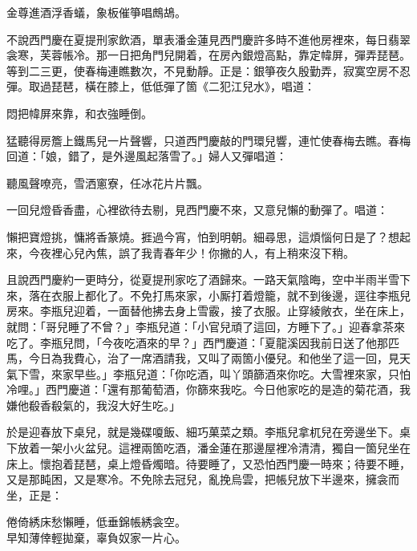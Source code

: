 \begin{myquote}
金尊進酒浮香蟻，象板催箏唱鷓鴣。
\end{myquote}

不說西門慶在夏提刑家飲酒，單表潘金蓮見西門慶許多時不進他房裡來，每日翡翠衾寒，芙蓉帳冷。那一日把角門兒開着，在房內銀燈高點，靠定幃屏，彈弄琵琶。等到二三更，使春梅連瞧數次，不見動靜。正是：銀箏夜久殷勤弄，寂寞空房不忍彈。取過琵琶，橫在膝上，低低彈了箇《二犯江兒水》，唱道：

\begin{myquote}
悶把幃屏來靠，和衣強睡倒。
\end{myquote}

猛聽得房簷上鐵馬兒一片聲響，只道西門慶敲的門環兒響，連忙使春梅去瞧。春梅回道：「娘，錯了，是外邊風起落雪了。」{}婦人又彈唱道：

\begin{myquote}
聽風聲嘹亮，雪洒窻寮，任冰花片片飄。
\end{myquote}

一回兒燈昏香盡，心裡欲待去剔，見西門慶不來，又意兒懶的動彈了。唱道：

\begin{myquote}
懶把寶燈挑，慵將香篆燒。捱過今宵，怕到明朝。細尋思，這煩惱何日是了？想起來，今夜裡心兒內焦，誤了我青春年少！你撇的人，有上稍來沒下稍。
\end{myquote}

且說西門慶約一更時分，從夏提刑家吃了酒歸來。一路天氣陰晦，空中半雨半雪下來，落在衣服上都化了。不免打馬來家，小厮打着燈籠，就不到後邊，逕往李瓶兒房來。李瓶兒迎着，一面替他拂去身上雪霰，接了衣服。止穿綾敞衣，坐在床上，就問：「哥兒睡了不曾？」李瓶兒道：「小官兒頑了這回，方睡下了。」迎春拿茶來吃了。李瓶兒問，「今夜吃酒來的早？」西門慶道：「夏龍溪因我前日送了他那匹馬，今日為我費心，治了一席酒請我，又叫了兩箇小優兒。和他坐了這一回，見天氣下雪，來家早些。」李瓶兒道：「你吃酒，叫丫頭篩酒來你吃。大雪裡來家，只怕冷哩。」西門慶道：「還有那葡萄酒，你篩來我吃。今日他家吃的是造的菊花酒，我嫌他殽香殽氣的，我沒大好生吃。」

於是迎春放下桌兒，就是幾碟嗄飯、細巧菓菜之類。李瓶兒拿杌兒在旁邊坐下。桌下放着一架小火盆兒。這裡兩箇吃酒，潘金蓮在那邊屋裡冷清清，獨自一箇兒坐在床上。懷抱着琵琶，桌上燈昏燭暗。待要睡了，又恐怕西門慶一時來；待要不睡，又是那盹困，又是寒冷。不免除去冠兒，亂挽烏雲，把帳兒放下半邊來，擁衾而坐，正是：

\begin{myquote}
倦倚綉床愁懶睡，低垂錦帳綉衾空。\\早知薄倖輕拋棄，辜負奴家一片心。
\end{myquote}

